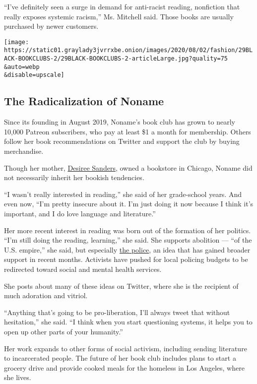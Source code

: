 ``I've definitely seen a surge in demand for anti-racist reading,
nonfiction that really exposes systemic racism,'' Ms. Mitchell said.
Those books are usually purchased by newer customers.

\texttt{[image: https://static01.graylady3jvrrxbe.onion/images/2020/08/02/fashion/29BLACK-BOOKCLUBS-2/29BLACK-BOOKCLUBS-2-articleLarge.jpg?quality=75\\\&auto=webp\\\&disable=upscale]}

\hypertarget{the-radicalization-of-noname}{%
\subsection{The Radicalization of
Noname}\label{the-radicalization-of-noname}}

Since its founding in August 2019, Noname's book club has grown to
nearly 10,000 Patreon subscribers, who pay at least \$1 a month for
membership. Others follow her book recommendations on Twitter and
support the club by buying merchandise.

Though her mother,
\href{https://twitter.com/nonamebooks/status/1153723696990715906?lang=en}{Desiree
Sanders}, owned a bookstore in Chicago, Noname did not necessarily
inherit her bookish tendencies.

``I wasn't really interested in reading,'' she said of her grade-school
years. And even now, ``I'm pretty insecure about it. I'm just doing it
now because I think it's important, and I do love language and
literature.''

Her more recent interest in reading was born out of the formation of her
politics. ``I'm still doing the reading, learning,'' she said. She
supports abolition --- ``of the U.S. empire,'' she said, but especially
\href{https://slack-redir.net/link?url=https\%3A\%2F\%2Fwww.nytimes3xbfgragh.onion\%2F2020\%2F06\%2F12\%2Fopinion\%2Fsunday\%2Ffloyd-abolish-defund-police.html}{the
police}, an idea that has gained broader support in recent months.
Activists have pushed for local policing budgets to be redirected toward
social and mental health services.

She posts about many of these ideas on Twitter, where she is the
recipient of much adoration and vitriol.

``Anything that's going to be pro-liberation, I'll always tweet that
without hesitation,'' she said. ``I think when you start questioning
systems, it helps you to open up other parts of your humanity.''

Her work expands to other forms of social activism, including sending
literature to incarcerated people. The future of her book club includes
plans to start a grocery drive and provide cooked meals for the homeless
in Los Angeles, where she lives.

